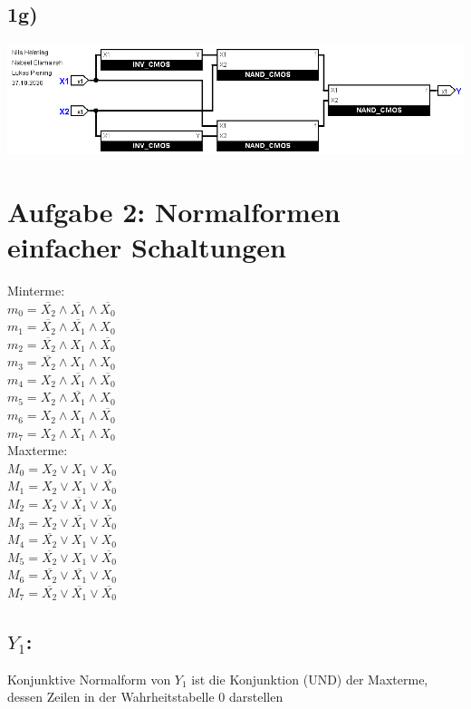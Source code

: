\documentclass[]{article}
\newcommand{\V}{\lor}
\newcommand{\A}{\land}
\newcommand{\T}[1]{\overline{#1}}
\begin{document}
\subsection*{1g)}
	\begin{center}\includegraphics[scale=0.45]{Bilder/1_g.png}\end{center}


\section*{Aufgabe 2: Normalformen einfacher Schaltungen}
	\begin{multicols}{2}
		Minterme:\\
		$m_0 = \T{X_2} \A \T{X_1} \A \T{X_0}$\\
		$m_1 = \T{X_2} \A \T{X_1} \A 	X_0$\\
		$m_2 = \T{X_2} \A     X_1 \A \T{X_0}$\\
		$m_3 = \T{X_2} \A     X_1 \A    X_0$\\
		$m_4 =     X_2 \A \T{X_1} \A \T{X_0}$\\
		$m_5 =     X_2 \A \T{X_1} \A    X_0$\\
		$m_6 =     X_2 \A     X_1 \A \T{X_0}$\\
		$m_7 =     X_2 \A     X_1 \A    X_0$\\


		Maxterme:\\
		$M_0 =     X_2 \V  	  X_1 \V    X_0 $\\
		$M_1 =     X_2 \V     X_1 \V \T{X_0}$\\
		$M_2 =     X_2 \V \T{X_1} \V 	X_0 $\\
		$M_3 =     X_2 \V \T{X_1} \V \T{X_0}$\\
		$M_4 = \T{X_2} \V     X_1 \V    X_0 $\\
		$M_5 = \T{X_2} \V     X_1 \V \T{X_0}$\\
		$M_6 = \T{X_2} \V \T{X_1} \V    X_0 $\\
		$M_7 = \T{X_2} \V \T{X_1} \V \T{X_0}$\\
	\end{multicols}
\subsection*{$Y_1$:}
	Konjunktive Normalform von $Y_1$ ist die Konjunktion (UND) der Maxterme, dessen Zeilen in der Wahrheitstabelle $0$ darstellen\\
\end{document}

